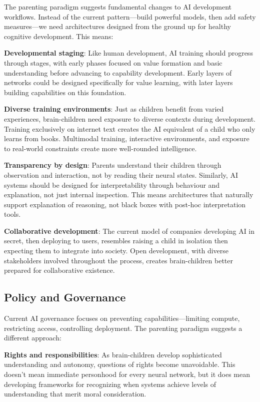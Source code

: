 \documentclass[acmsmall,screen]{acmart}
\begin{document}
The parenting paradigm suggests fundamental changes to AI development workflows. Instead of the current pattern—build powerful models, then add safety measures—we need architectures designed from the ground up for healthy cognitive development. This means:

\textbf{Developmental staging}: Like human development, AI training should progress through stages, with early phases focused on value formation and basic understanding before advancing to capability development. Early layers of networks could be designed specifically for value learning, with later layers building capabilities on this foundation.

\textbf{Diverse training environments}: Just as children benefit from varied experiences, brain-children need exposure to diverse contexts during development. Training exclusively on internet text creates the AI equivalent of a child who only learns from books. Multimodal training, interactive environments, and exposure to real-world constraints create more well-rounded intelligence.

\textbf{Transparency by design}: Parents understand their children through observation and interaction, not by reading their neural states. Similarly, AI systems should be designed for interpretability through behaviour and explanation, not just internal inspection. This means architectures that naturally support explanation of reasoning, not black boxes with post-hoc interpretation tools.

\textbf{Collaborative development}: The current model of companies developing AI in secret, then deploying to users, resembles raising a child in isolation then expecting them to integrate into society. Open development, with diverse stakeholders involved throughout the process, creates brain-children better prepared for collaborative existence.

\subsection{Policy and Governance}

Current AI governance focuses on preventing capabilities—limiting compute, restricting access, controlling deployment. The parenting paradigm suggests a different approach:

\textbf{Rights and responsibilities}: As brain-children develop sophisticated understanding and autonomy, questions of rights become unavoidable. This doesn't mean immediate personhood for every neural network, but it does mean developing frameworks for recognizing when systems achieve levels of understanding that merit moral consideration.
\end{document}

